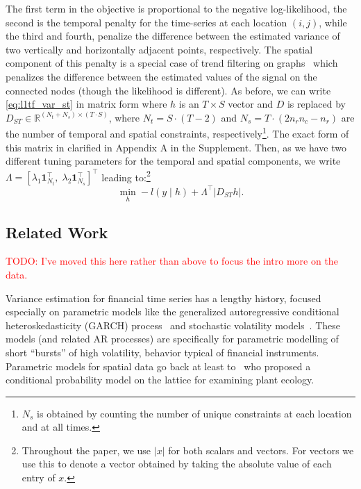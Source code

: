 \documentclass[letterpaper]{article} %
\newcommand{\attn}[1]{\textcolor{red}{TODO: #1}}
\newcommand{\one}{\mathbf{1}}
\newcommand{\given}{\;\vert\;}
\begin{document}
The first term in the objective is proportional to the negative
log-likelihood, the second is the temporal penalty for the
time-series at each location $(i,j)$, while the third and fourth,
penalize the difference between the estimated variance of two
vertically and horizontally adjacent points, respectively. The spatial
component of this
penalty is a special case of trend filtering on
graphs~\cite{WangSharpnack2016} which penalizes the difference between
the estimated values of the signal on the connected nodes (though the
likelihood is different). As before,
we can write \eqref{eq:l1tf_var_st} in matrix form where $h$ is an
$T\times S$ vector and $D$ is replaced by $D_{ST} \in
\mathbb{R}^{(N_t+N_s) \times (T \cdot S)	}$, where $N_t=S \cdot
(T-2)$ and $N_s=T \cdot (2n_rn_c-n_r)$ are the number of temporal and
spatial constraints, respectively\footnote{$N_s$ is obtained by
  counting the number of unique constraints at each location and at
  all times.}. The exact form of this matrix in clarified in Appendix
A in the Supplement. Then, as we have two different tuning parameters
for the temporal and spatial components, we write $\Lambda
=\left[\lambda_1\one_{N_t}^\top,\;
  \lambda_2\one_{N_s}^\top\right]^\top$ leading
to:\footnote{Throughout the paper, we use $|x|$ for both scalars and
  vectors. For vectors we use this to denote a vector obtained by
  taking the absolute value of each entry of $x$.}  
\begin{equation}
\min_h -l(y\given h)+ \Lambda^\top | D_{ST}h |.
\label{eq:l1tf_var_st_mat}
\end{equation}

\subsection{Related Work}

\attn{I've moved this here rather than above to focus the intro more
  on the data.}

Variance estimation for financial time series has a lengthy history,
focused especially on parametric models like the generalized
autoregressive conditional heteroskedasticity (GARCH) process~\cite{engle2002dynamic} and
stochastic volatility models~\cite{HarveyRuiz1994}. These models (and
related AR processes) are specifically for parametric modelling of
short ``bursts'' of high volatility, behavior typical of financial
instruments. Parametric models for spatial data go back at least
to~\cite{besag1974spatial} who proposed a conditional probability
model on the lattice for examining plant ecology.
\end{document}
